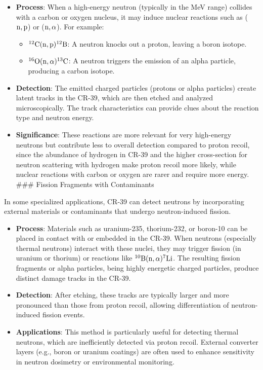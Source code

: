 \documentclass[
]{article}
\renewcommand{\[}{\begin{equation}}
\renewcommand{\]}{\end{equation}}
\providecommand{\tightlist}{%
  \setlength{\itemsep}{0pt}\setlength{\parskip}{0pt}}
\begin{document}
\begin{itemize}
\tightlist
\item
  \textbf{Process}: When a high-energy neutron (typically in the MeV
  range) collides with a carbon or oxygen nucleus, it may induce nuclear
  reactions such as (\(\rm n, p\)) or (\(\rm n, \alpha\)). For example:

  \begin{itemize}
  \tightlist
  \item
    \(\rm ^{12}C(n, p)^{12}B\): A neutron knocks out a proton, leaving a
    boron isotope.
  \item
    \(\rm ^{16}O(n, \alpha)^{13}C\): A neutron triggers the emission of
    an alpha particle, producing a carbon isotope.
  \end{itemize}
\item
  \textbf{Detection}: The emitted charged particles (protons or alpha
  particles) create latent tracks in the CR-39, which are then etched
  and analyzed microscopically. The track characteristics can provide
  clues about the reaction type and neutron energy.
\item
  \textbf{Significance}: These reactions are more relevant for very
  high-energy neutrons but contribute less to overall detection compared
  to proton recoil, since the abundance of hydrogen in CR-39 and the
  higher cross-section for neutron scattering with hydrogen make proton
  recoil more likely, while nuclear reactions with carbon or oxygen are
  rarer and require more energy. \#\#\# Fission Fragments with
  Contaminants
\end{itemize}

In some specialized applications, CR-39 can detect neutrons by
incorporating external materials or contaminants that undergo
neutron-induced fission.

\begin{itemize}
\tightlist
\item
  \textbf{Process}: Materials such as uranium-235, thorium-232, or
  boron-10 can be placed in contact with or embedded in the CR-39. When
  neutrons (especially thermal neutrons) interact with these nuclei,
  they may trigger fission (in uranium or thorium) or reactions like
  \(\rm ^{10}B(n, \alpha)^{7}Li\). The resulting fission fragments or
  alpha particles, being highly energetic charged particles, produce
  distinct damage tracks in the CR-39.
\item
  \textbf{Detection}: After etching, these tracks are typically larger
  and more pronounced than those from proton recoil, allowing
  differentiation of neutron-induced fission events.
\item
  \textbf{Applications}: This method is particularly useful for
  detecting thermal neutrons, which are inefficiently detected via
  proton recoil. External converter layers (e.g., boron or uranium
  coatings) are often used to enhance sensitivity in neutron dosimetry
  or environmental monitoring.
\end{itemize}
\end{document}
